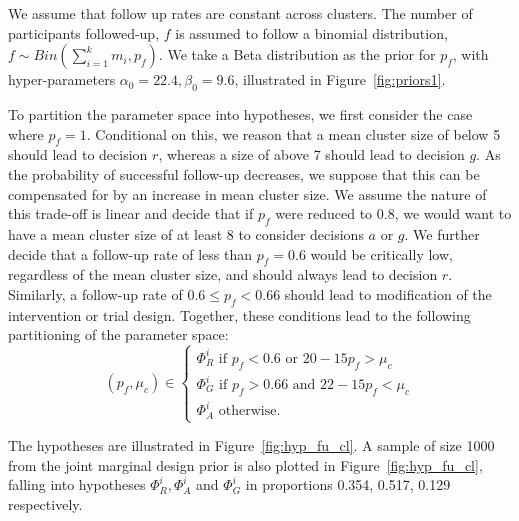 \documentclass{article} %
\begin{document}
We assume that follow up rates are constant across clusters. The number of participants followed-up, $f$ is assumed to follow a binomial distribution, $f \sim Bin(\sum_{i=1}^{k} m_{i}, p_{f})$. We take a Beta distribution as the prior for $p_{f}$, with hyper-parameters $\alpha_{0} = 22.4, \beta_{0} = 9.6$, illustrated in Figure~\ref{fig:priors1}.

To partition the parameter space into hypotheses, we first consider the case where $p_{f} = 1$. Conditional on this, we reason that a mean cluster size of below 5 should lead to decision $r$, whereas a size of above 7 should lead to decision $g$. As the probability of successful follow-up decreases, we suppose that this can be compensated for by an increase in mean cluster size. We assume the nature of this trade-off is linear and decide that if $p_{f}$ were reduced to 0.8, we would want to have a mean cluster size of at least 8 to consider decisions $a$ or $g$.  We further decide that a follow-up rate of less than $p_{f} = 0.6$ would be critically low, regardless of the mean cluster size, and should always lead to decision $r$. Similarly, a follow-up rate of $0.6 \leq p_{f} < 0.66$ should lead to modification of the intervention or trial design. Together, these conditions lead to the following partitioning of the parameter space:
\begin{equation}
  (p_{f}, \mu_{c}) \in \begin{cases}
               \Phi^i_R \text{ if } p_{f} < 0.6 \text{ or } 20-15p_{f} > \mu_{c} \\
               \Phi^i_G \text{ if } p_{f} > 0.66 \text{ and } 22-15p_{f} < \mu_{c} \\
               \Phi^i_A \text{ otherwise.}
            \end{cases}
\end{equation}

The hypotheses are illustrated in Figure~\ref{fig:hyp_fu_cl}. A sample of size 1000 from the joint marginal design prior is also plotted in Figure~\ref{fig:hyp_fu_cl}, falling into hypotheses  $\Phi^i_R, \Phi^i_A$ and $\Phi^i_G$ in proportions 0.354, 0.517, 0.129 respectively.
\end{document}
